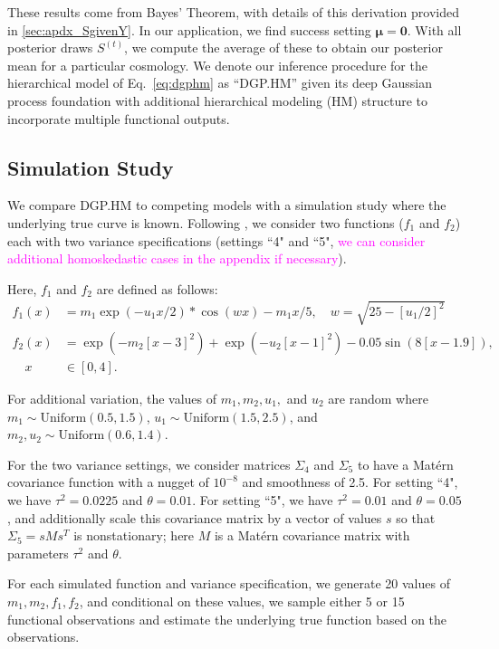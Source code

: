 \documentclass[11pt]{article}
\begin{document}
These results come from Bayes' Theorem, with details of this derivation provided 
in \ref{sec:apdx_SgivenY}. In our application, we find success setting 
$\boldsymbol{\mu}=\boldsymbol{0}$. With all posterior draws $S^{(t)}$, we compute
the average of these to obtain our posterior mean for a particular cosmology.
We denote our inference procedure for the hierarchical model of Eq.~\ref{eq:dgphm} as
``DGP.HM'' given its deep Gaussian process foundation with additional hierarchical modeling (HM)
structure to incorporate multiple functional outputs.

\subsection{Simulation Study}
\label{subsec:sim}

We compare DGP.HM to competing models with a simulation study where the underlying 
true curve is known. Following \cite{moran2024dpc}, we consider two functions 
($f_1$ and $f_2$) each with two variance specifications (settings ``4" and ``5", 
\textcolor{magenta}{we can consider additional homoskedastic cases in the appendix if necessary}). 

Here, $f_1$ and $f_2$ are defined as follows:
\begin{align}
  f_1(x) &= m_1 \exp(-u_1x/2) * \cos(wx) - m_1x/5, \quad w=\sqrt{25-[u_1/2]^2} \\
  f_2(x) &= \exp(-m_2[x-3]^2)+\exp(-u_2[x-1]^2)-0.05\sin(8[x-1.9]), \\ 
  \quad x &\in [0,4].
\end{align}

For additional variation, the values of $m_1, m_2, u_1,$ and $u_2$ are random where 
$m_1 \sim \text{Uniform}(0.5,1.5)$, $u_1 \sim \text{Uniform}(1.5,2.5)$, and $m_2,u_2 
\sim \text{Uniform}(0.6,1.4)$. 
      
For the two variance settings, we consider matrices $\Sigma_4$ and $\Sigma_5$ to 
have a Mat\'ern covariance function with a nugget of $10^{-8}$ and smoothness of 2.5. 
For setting ``4", we have $\tau^2=0.0225$ and $\theta=0.01$. For setting ``5", we have 
$\tau^2=0.01$ and $\theta=0.05$, and additionally scale this covariance matrix by 
a vector of values $s$ so that $\Sigma_5 = s M s^T$ is nonstationary; here $M$ is 
a Mat\'ern covariance matrix with parameters $\tau^2$ and $\theta$.

For each simulated function and variance specification, we generate 20 values of 
$m_1, m_2, f_1, f_2$, and conditional on these values, we sample either 5 or 15 
functional observations and estimate the underlying true function based on the observations.
\end{document}
